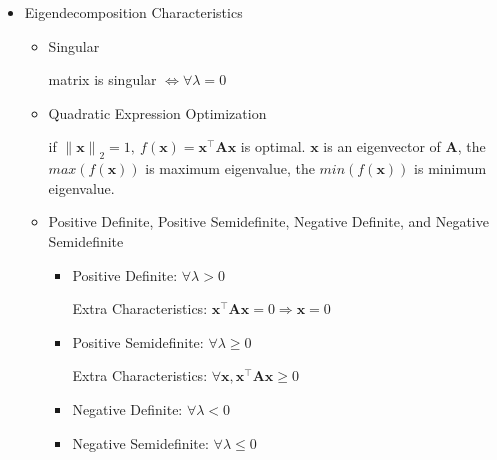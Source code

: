 \begin{itemize}
  \newpage

  \item Eigendecomposition Characteristics

  \begin{itemize}

    \item Singular

    matrix is singular $\iff \forall \lambda = 0$

    \item Quadratic Expression Optimization

    if ${\| \bm{x} \|} _ 2 = 1,\ f(\bm{x}) = \bm{x} ^ \top \bm{A} \bm{x}$ is optimal.
    $\bm{x}$ is an eigenvector of $\bm{A}$, the $max(f(\bm{x}))$ is maximum eigenvalue, the $min(f(\bm{x}))$ is minimum eigenvalue.

    \item Positive Definite, Positive Semidefinite, Negative Definite, and Negative Semidefinite
    \begin{itemize}
      \item Positive Definite: $\forall \lambda > 0$

        Extra Characteristics: $\bm{x} ^ \top \bm{A} \bm{x} = 0 \Rightarrow \bm{x} = 0$

      \item Positive Semidefinite: $\forall \lambda \geq 0$

        Extra Characteristics: $\forall \bm{x}, \bm{x} ^ \top \bm{A} \bm{x} \geq 0$

      \item Negative Definite: $\forall \lambda < 0$
      \item Negative Semidefinite: $\forall \lambda \leq 0$
    \end{itemize}

  \end{itemize}

\end{itemize}

